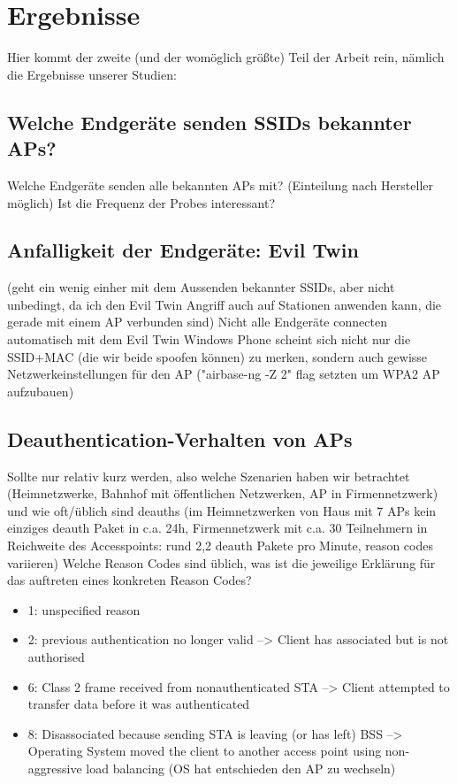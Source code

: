 \section{Ergebnisse}
Hier kommt der zweite (und der womöglich größte) Teil der Arbeit rein, nämlich die Ergebnisse unserer Studien:

\subsection{Welche Endgeräte senden SSIDs bekannter APs?}
Welche Endgeräte senden alle bekannten APs mit? (Einteilung nach Hersteller möglich)  
Ist die Frequenz der Probes interessant?

\subsection{Anfalligkeit der Endgeräte: Evil Twin}
(geht ein wenig einher mit dem Aussenden bekannter SSIDs, aber nicht unbedingt, da ich den Evil Twin Angriff auch auf Stationen anwenden kann, die gerade mit einem AP verbunden sind)
Nicht alle Endgeräte connecten automatisch mit dem Evil Twin
Windows Phone scheint sich nicht nur die SSID+MAC (die wir beide spoofen können) zu merken, sondern auch gewisse Netzwerkeinstellungen für den AP ("airbase-ng -Z 2" flag setzten um WPA2 AP aufzubauen)

\subsection{Deauthentication-Verhalten von APs}
Sollte nur relativ kurz werden, also welche Szenarien haben wir betrachtet (Heimnetzwerke, Bahnhof mit öffentlichen Netzwerken, AP in Firmennetzwerk) und wie oft/üblich sind deauths (im Heimnetzwerken von Haus mit 7 APs kein einziges deauth Paket in c.a. 24h, Firmennetzwerk mit c.a. 30 Teilnehmern in Reichweite des Accesspoints: rund 2,2 deauth Pakete pro Minute, reason codes variieren)
Welche Reason Codes sind üblich, was ist die jeweilige Erklärung für das auftreten eines konkreten Reason Codes?
\begin{itemize}
	\item 1: unspecified reason 
    \item 2: previous authentication no longer valid --> Client has associated but is not authorised
    \item 6: Class 2 frame received from nonauthenticated STA --> Client attempted to transfer data before it was authenticated
   	\item 8: Disassociated because sending STA is leaving (or has left) BSS --> Operating System moved the client to another access point using non-aggressive load balancing (OS hat entschieden den AP zu wechseln)  
\end{itemize}